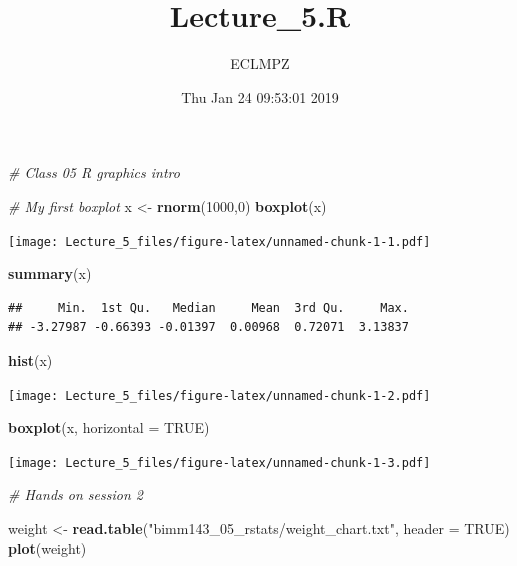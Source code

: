 \documentclass[]{article}
\title{Lecture\_5.R}
\author{ECLMPZ}
\date{Thu Jan 24 09:53:01 2019}
\newenvironment{Shaded}{\begin{snugshade}}{\end{snugshade}}
\newcommand{\KeywordTok}[1]{\textcolor[rgb]{0.13,0.29,0.53}{\textbf{#1}}}
\newcommand{\DataTypeTok}[1]{\textcolor[rgb]{0.13,0.29,0.53}{#1}}
\newcommand{\DecValTok}[1]{\textcolor[rgb]{0.00,0.00,0.81}{#1}}
\newcommand{\StringTok}[1]{\textcolor[rgb]{0.31,0.60,0.02}{#1}}
\newcommand{\CommentTok}[1]{\textcolor[rgb]{0.56,0.35,0.01}{\textit{#1}}}
\newcommand{\OtherTok}[1]{\textcolor[rgb]{0.56,0.35,0.01}{#1}}
\newcommand{\NormalTok}[1]{#1}
\begin{document}
\maketitle

\begin{Shaded}
\begin{Highlighting}[]
\CommentTok{# Class 05 R graphics intro }

\CommentTok{# My first boxplot}
\NormalTok{x <-}\StringTok{ }\KeywordTok{rnorm}\NormalTok{(}\DecValTok{1000}\NormalTok{,}\DecValTok{0}\NormalTok{)}
\KeywordTok{boxplot}\NormalTok{(x)}
\end{Highlighting}
\end{Shaded}

\texttt{[image: Lecture\_5\_files/figure-latex/unnamed-chunk-1-1.pdf]}

\begin{Shaded}
\begin{Highlighting}[]
\KeywordTok{summary}\NormalTok{(x)}
\end{Highlighting}
\end{Shaded}

\begin{verbatim}
##     Min.  1st Qu.   Median     Mean  3rd Qu.     Max. 
## -3.27987 -0.66393 -0.01397  0.00968  0.72071  3.13837
\end{verbatim}

\begin{Shaded}
\begin{Highlighting}[]
\KeywordTok{hist}\NormalTok{(x)}
\end{Highlighting}
\end{Shaded}

\texttt{[image: Lecture\_5\_files/figure-latex/unnamed-chunk-1-2.pdf]}

\begin{Shaded}
\begin{Highlighting}[]
\KeywordTok{boxplot}\NormalTok{(x, }\DataTypeTok{horizontal =} \OtherTok{TRUE}\NormalTok{)}
\end{Highlighting}
\end{Shaded}

\texttt{[image: Lecture\_5\_files/figure-latex/unnamed-chunk-1-3.pdf]}

\begin{Shaded}
\begin{Highlighting}[]
\CommentTok{# Hands on session 2 }

\NormalTok{weight <-}\StringTok{ }\KeywordTok{read.table}\NormalTok{(}\StringTok{"bimm143_05_rstats/weight_chart.txt"}\NormalTok{, }\DataTypeTok{header =} \OtherTok{TRUE}\NormalTok{)}
\KeywordTok{plot}\NormalTok{(weight)}
\end{Highlighting}
\end{Shaded}
\end{document}
